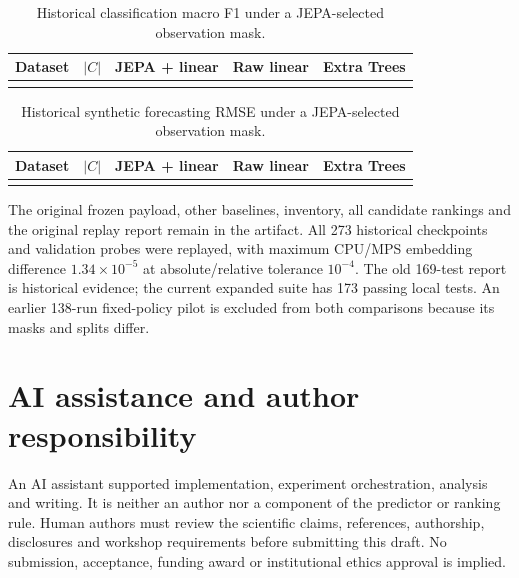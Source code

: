\documentclass{article}
\begin{document}
\begin{table}[h]
\caption{Historical classification macro F1 under a JEPA-selected observation mask.}\centering\small
\begin{tabular}{lrccc}\toprule
Dataset & $|C|$ & JEPA + linear & Raw linear & Extra Trees\\\midrule
\\\bottomrule
\end{tabular}
\end{table}
\begin{table}[h]
\caption{Historical synthetic forecasting RMSE under a JEPA-selected observation mask.}\centering\small
\begin{tabular}{lrccc}\toprule
Dataset & $|C|$ & JEPA + linear & Raw linear & Extra Trees\\\midrule
\\\bottomrule
\end{tabular}
\end{table}
\FloatBarrier
The original frozen payload, other baselines, inventory, all candidate rankings and the original replay report remain in the artifact. All 273 historical checkpoints and validation probes were replayed, with maximum CPU/MPS embedding difference $1.34\times10^{-5}$ at absolute/relative tolerance $10^{-4}$. The old 169-test report is historical evidence; the current expanded suite has 173 passing local tests. An earlier 138-run fixed-policy pilot is excluded from both comparisons because its masks and splits differ.

\section{AI assistance and author responsibility}
An AI assistant supported implementation, experiment orchestration, analysis and writing. It is neither an author nor a component of the predictor or ranking rule. Human authors must review the scientific claims, references, authorship, disclosures and workshop requirements before submitting this draft. No submission, acceptance, funding award or institutional ethics approval is implied.
\end{document}
